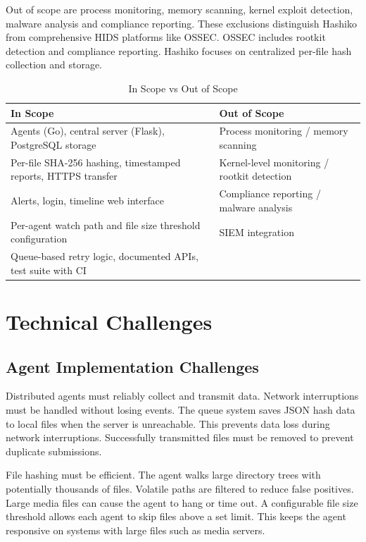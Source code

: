 \documentclass[conference]{IEEEtran}
\begin{document}
Out of scope are process monitoring, memory scanning, kernel exploit detection, malware analysis and compliance reporting. These exclusions distinguish Hashiko from comprehensive HIDS platforms like OSSEC. OSSEC includes rootkit detection and compliance reporting. Hashiko focuses on centralized per-file hash collection and storage.

\begin{table}[h]
\centering
\caption{In Scope vs Out of Scope}
\begin{tabular}{|p{4cm}|p{4cm}|}
\hline
\textbf{In Scope} & \textbf{Out of Scope} \\
\hline
Agents (Go), central server (Flask), PostgreSQL storage & Process monitoring / memory scanning \\
\hline
Per-file SHA-256 hashing, timestamped reports, HTTPS transfer & Kernel-level monitoring / rootkit detection \\
\hline
Alerts, login, timeline web interface & Compliance reporting / malware analysis \\
\hline
Per-agent watch path and file size threshold configuration & SIEM integration \\
\hline
Queue-based retry logic, documented APIs, test suite with CI & \\
\hline
\end{tabular}
\end{table}

\section{Technical Challenges}

\subsection{Agent Implementation Challenges}

Distributed agents must reliably collect and transmit data. Network interruptions must be handled without losing events. The queue system saves JSON hash data to local files when the server is unreachable. This prevents data loss during network interruptions. Successfully transmitted files must be removed to prevent duplicate submissions.

File hashing must be efficient. The agent walks large directory trees with potentially thousands of files. Volatile paths are filtered to reduce false positives. Large media files can cause the agent to hang or time out. A configurable file size threshold allows each agent to skip files above a set limit. This keeps the agent responsive on systems with large files such as media servers.
\end{document}
